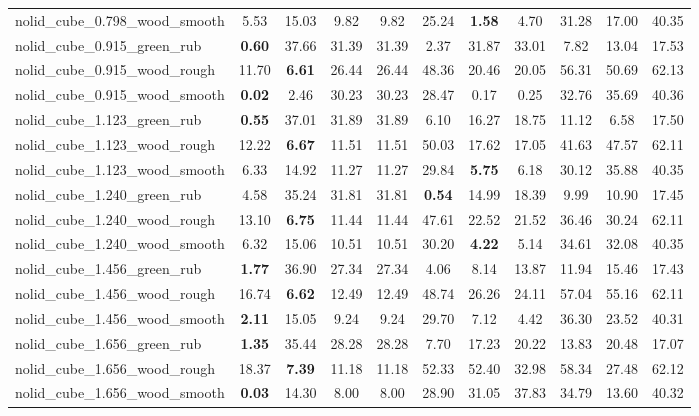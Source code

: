 \begin{table}[H]
{\begin{tabular}{l cccccccccc}
        nolid\_cube\_0.798\_wood\_smooth & 5.53 & 15.03 & 9.82 & 9.82 & 25.24 & \textbf{1.58} & 4.70 & 31.28 & 17.00 & 40.35 \\
        nolid\_cube\_0.915\_green\_rub & \textbf{0.60} & 37.66 & 31.39 & 31.39 & 2.37 & 31.87 & 33.01 & 7.82 & 13.04 & 17.53 \\
        nolid\_cube\_0.915\_wood\_rough & 11.70 & \textbf{6.61} & 26.44 & 26.44 & 48.36 & 20.46 & 20.05 & 56.31 & 50.69 & 62.13 \\
        nolid\_cube\_0.915\_wood\_smooth & \textbf{0.02} & 2.46 & 30.23 & 30.23 & 28.47 & 0.17 & 0.25 & 32.76 & 35.69 & 40.36 \\
        nolid\_cube\_1.123\_green\_rub & \textbf{0.55} & 37.01 & 31.89 & 31.89 & 6.10 & 16.27 & 18.75 & 11.12 & 6.58 & 17.50 \\
        nolid\_cube\_1.123\_wood\_rough & 12.22 & \textbf{6.67} & 11.51 & 11.51 & 50.03 & 17.62 & 17.05 & 41.63 & 47.57 & 62.11 \\
        nolid\_cube\_1.123\_wood\_smooth & 6.33 & 14.92 & 11.27 & 11.27 & 29.84 & \textbf{5.75} & 6.18 & 30.12 & 35.88 & 40.35 \\
        nolid\_cube\_1.240\_green\_rub & 4.58 & 35.24 & 31.81 & 31.81 & \textbf{0.54} & 14.99 & 18.39 & 9.99 & 10.90 & 17.45 \\
        nolid\_cube\_1.240\_wood\_rough & 13.10 & \textbf{6.75} & 11.44 & 11.44 & 47.61 & 22.52 & 21.52 & 36.46 & 30.24 & 62.11 \\
        nolid\_cube\_1.240\_wood\_smooth & 6.32 & 15.06 & 10.51 & 10.51 & 30.20 & \textbf{4.22} & 5.14 & 34.61 & 32.08 & 40.35 \\
        nolid\_cube\_1.456\_green\_rub & \textbf{1.77} & 36.90 & 27.34 & 27.34 & 4.06 & 8.14 & 13.87 & 11.94 & 15.46 & 17.43 \\
        nolid\_cube\_1.456\_wood\_rough & 16.74 & \textbf{6.62} & 12.49 & 12.49 & 48.74 & 26.26 & 24.11 & 57.04 & 55.16 & 62.11 \\
        nolid\_cube\_1.456\_wood\_smooth & \textbf{2.11} & 15.05 & 9.24 & 9.24 & 29.70 & 7.12 & 4.42 & 36.30 & 23.52 & 40.31 \\
        nolid\_cube\_1.656\_green\_rub & \textbf{1.35} & 35.44 & 28.28 & 28.28 & 7.70 & 17.23 & 20.22 & 13.83 & 20.48 & 17.07 \\
        nolid\_cube\_1.656\_wood\_rough & 18.37 & \textbf{7.39} & 11.18 & 11.18 & 52.33 & 52.40 & 32.98 & 58.34 & 27.48 & 62.12 \\
        nolid\_cube\_1.656\_wood\_smooth & \textbf{0.03} & 14.30 & 8.00 & 8.00 & 28.90 & 31.05 & 37.83 & 34.79 & 13.60 & 40.32 \\

\end{tabular}}
\end{table}
